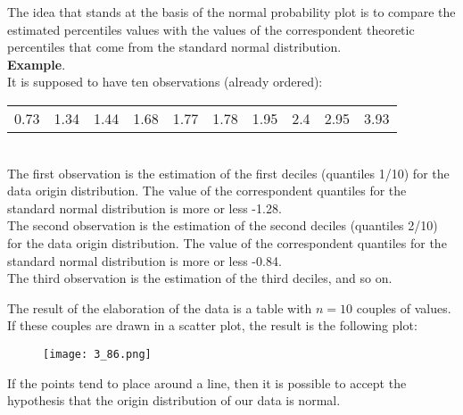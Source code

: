 \begin{frame}
  The idea that stands at the basis of the normal probability plot is to compare the estimated percentiles values with the values of the correspondent theoretic percentiles that come from the standard normal distribution.\\
  \vspace*{.25cm}
  \textbf{Example}.\\
  It is supposed to have ten observations (already ordered):\\
  \begin{tabular}{llllllllll}
    0.73 & 1.34 & 1.44 & 1.68 & 1.77 & 1.78 & 1.95 & 2.4 & 2.95 & 3.93
  \end{tabular}\\
  The first observation is the estimation of the first deciles (quantiles 1/10) for the data origin distribution. The value of the correspondent quantiles for the standard normal distribution is more or less -1.28.\\
  The second observation is the estimation of the second deciles (quantiles 2/10) for the data origin distribution. The value of the correspondent quantiles for the standard normal distribution is more or less -0.84.\\
  The third observation is the estimation of the third deciles, and so on.
\end{frame}

\begin{frame}
  \vspace*{.25cm}
  The result of the elaboration of the data is a table with $ n = 10 $ couples of values. If these couples are drawn in a scatter plot, the result is the following plot:
  \begin{figure}
    \texttt{[image: 3\_86.png]}
  \end{figure}
  If the points tend to place around a line, then it is possible to accept the hypothesis that the origin distribution of our data is normal.
\end{frame}

